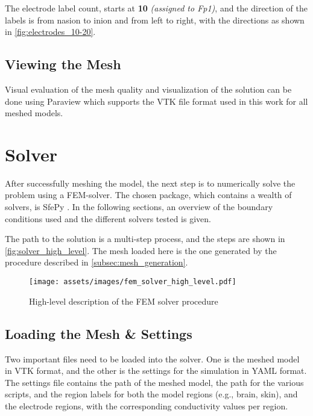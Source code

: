 The electrode label count, starts at \textbf{10} \textit{(assigned to Fp1)}, and the direction of the labels is from \gls{nasion} to \gls{inion} and from left to right, with the directions as shown in \autoref{fig:electrodes_10-20}.

\subsection{Viewing the Mesh}

Visual evaluation of the mesh quality and visualization of the solution can be done using Paraview \cite{paraview} which supports the \gls{VTK} file format used in this work for all meshed models.

\section{Solver}
\label{sec:fem_solver}

After successfully meshing the model, the next step is to numerically solve the problem using a \gls{FEM}-solver. The chosen package, which contains a wealth of solvers, is SfePy \cite{Cimrman2019}. In the following sections, an overview of the boundary conditions used and the different solvers tested is given.

The path to the solution is a multi-step process, and the steps are shown in \autoref{fig:solver_high_level}. The mesh loaded here is the one generated by the procedure described in \ref{subsec:mesh_generation}.

\begin{figure}[H]
    \centering
    \texttt{[image: assets/images/fem\_solver\_high\_level.pdf]}
    \caption{High-level description of the \gls{FEM} solver procedure}
    \label{fig:solver_high_level}
\end{figure}

\subsection{Loading the Mesh \& Settings}

Two important files need to be loaded into the solver. One is the meshed model in \gls{VTK} format, and the other is the settings for the simulation in \gls{YAML} format. The settings file contains the path of the meshed model, the path for the various scripts, and the region labels for both the model regions (e.g., brain, skin), and the electrode regions, with the corresponding conductivity values per region.

